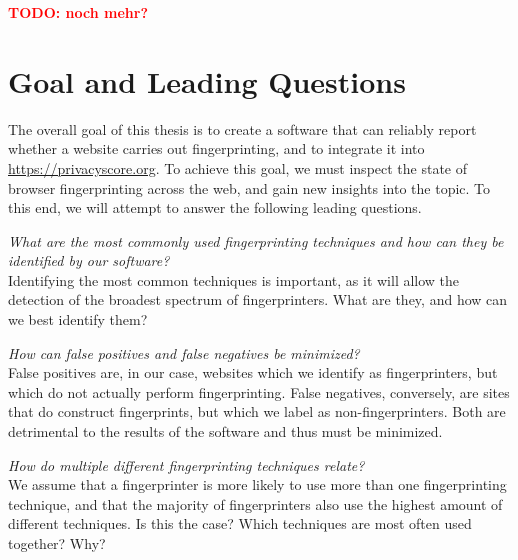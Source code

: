 \documentclass[
    fontsize=12pt,
    headings=small,
    parskip=half,
    bibliography=totoc,
    numbers=noenddot,
    open=any
    ]{scrreprt}
\newcommand{\todo}[1]{\textcolor{red}{\textbf{TODO: #1}}}
\begin{document}
\todo{noch mehr?}

\section{Goal and Leading Questions}
The overall goal of this thesis is to create a software that can reliably report whether a website carries out
fingerprinting, and to integrate it into \url{https://privacyscore.org}. To achieve this goal,
we must inspect the state of browser fingerprinting across the web, and gain new insights into the topic.
To this end, we will attempt to answer the following leading questions.

\textit{What are the most commonly used fingerprinting techniques and how can they be identified by our software?}\\
Identifying the most common techniques is important, as it will allow the detection of the broadest spectrum
of fingerprinters. What are they, and how can we best identify them?

\textit{How can false positives and false negatives be minimized?}\\
False positives are, in our case, websites which we identify as fingerprinters, but which do not actually
perform fingerprinting. False negatives, conversely, are sites that do construct fingerprints, but which we
label as non-fingerprinters.
Both are detrimental to the results of the software and thus must be minimized.

\textit{How do multiple different fingerprinting techniques relate?}\\
We assume that a fingerprinter is more likely to use more than one fingerprinting technique,
and that the majority of fingerprinters also use the highest amount of different techniques.
Is this the case? Which techniques are most often used together? Why?
\end{document}
